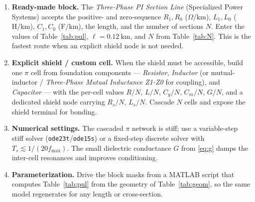 \documentclass[11pt,a4paper,oneside]{book}
\begin{document}
\begin{onehalfspace}
\begin{appendices}
\begin{enumerate}[leftmargin=*]
	\item \textbf{Ready-made block.} The \emph{Three-Phase PI Section Line} (Specialized
	Power Systems) accepts the positive- and zero-sequence $R_1,R_0$
	($\Omega/\mathrm{km}$), $L_1,L_0$ ($\mathrm{H/km}$), $C_1,C_0$
	($\mathrm{F/km}$), the length, and the number of sections $N$. Enter the values
	of Table~\ref{tab:pul}, $\ell=0.12\ \mathrm{km}$, and $N$ from
	Table~\ref{tab:N}. This is the fastest route when an explicit shield node is not
	needed.
	\item \textbf{Explicit shield / custom cell.} When the shield must be accessible,
	build one $\pi$ cell from foundation components --- \emph{Resistor},
	\emph{Inductor} (or mutual-inductor / \emph{Three-Phase Mutual Inductance Z1-Z0}
	for coupling), and \emph{Capacitor} --- with the per-cell values $R/N$, $L/N$,
	$C_g/N$, $C_m/N$, $G/N$, and a dedicated shield node carrying $R_s/N$, $L_s/N$.
	Cascade $N$ cells and expose the shield terminal for bonding.
	\item \textbf{Numerical settings.} The cascaded $\pi$ network is stiff; use a
	variable-step stiff solver (\texttt{ode23t}/\texttt{ode15s}) or a fixed-step
	discrete solver with $T_s \lesssim 1/(20 f_{\max})$. The small dielectric
	conductance $G$ from \eqref{eq:g} damps the inter-cell resonances and improves
	conditioning.
	\item \textbf{Parameterization.} Drive the block masks from a MATLAB script that
	computes Table~\ref{tab:pul} from the geometry of Table~\ref{tab:geom}, so the same
	model regenerates for any length or cross-section.
\end{enumerate}


\end{appendices}
\end{onehalfspace}
\end{document}
